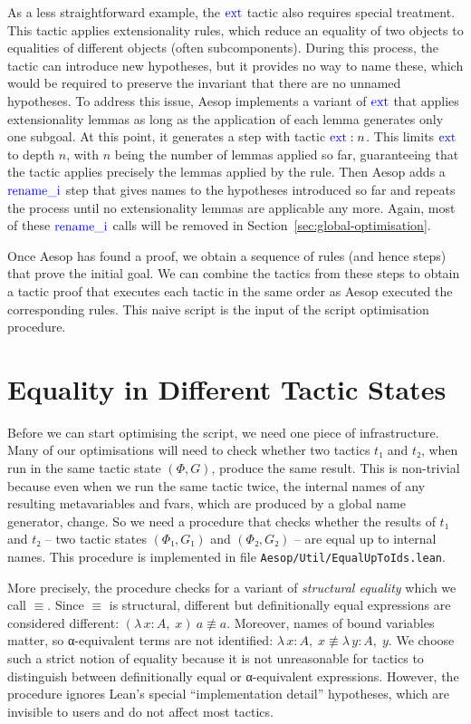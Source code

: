 \documentclass[sigplan,10pt,anonymous,review]{acmart}
\newcommand{\tac}[1]{\ensuremath{\mathrm{\mathcolor{blue}{#1}}}}
\newcommand{\Lam}[2]{λ\,#1,\; #2}
\begin{document}
As a less straightforward example, the \tac{ext} tactic also requires special treatment.
This tactic applies extensionality rules, which reduce an equality of two objects to equalities of different objects (often subcomponents).
During this process, the tactic can introduce new hypotheses, but it provides no way to name these, which would be required to preserve the invariant that there are no unnamed hypotheses.
To address this issue, Aesop implements a variant of \tac{ext} that applies extensionality lemmas as long as the application of each lemma generates only one subgoal.
At this point, it generates a step with tactic $\tac{ext} : n$.
This limits \tac{ext} to depth $n$, with $n$ being the number of lemmas applied so far, guaranteeing that the tactic applies precisely the lemmas applied by the rule.
Then Aesop adds a \tac{rename\_i} step that gives names to the hypotheses introduced so far and repeats the process until no extensionality lemmas are applicable any more.
Again, most of these \tac{rename\_i} calls will be removed in Section~\ref{sec:global-optimisation}.

\medskip

Once Aesop has found a proof, we obtain a sequence of rules (and hence steps) that prove the initial goal.
We can combine the tactics from these steps to obtain a tactic proof that executes each tactic in the same order as Aesop executed the corresponding rules.
This naive script is the input of the script optimisation procedure.

\section{Equality in Different Tactic States}%
\label{sec:equality}

Before we can start optimising the script, we need one piece of infrastructure.
Many of our optimisations will need to check whether two tactics $t₁$ and $t₂$, when run in the same tactic state $(Φ, G)$, produce the same result.
This is non-trivial because even when we run the same tactic twice, the internal names of any resulting metavariables and fvars, which are produced by a global name generator, change.
So we need a procedure that checks whether the results of $t₁$ and $t₂$ -- two tactic states $(Φ₁, G₁)$ and $(Φ₂, G₂)$ -- are equal up to internal names.
This procedure is implemented in file \texttt{Aesop/Util/EqualUpToIds.lean}.

More precisely, the procedure checks for a variant of \emph{structural equality} which we call $≡$.
Since $≡$ is structural, different but definitionally equal expressions are considered different: $(\Lam{x : A}{x})~a ≢ a$.
Moreover, names of bound variables matter, so α-equivalent terms are not identified: $\Lam{x : A}{x} ≢ \Lam{y : A}{y}$.
We choose such a strict notion of equality because it is not unreasonable for tactics to distinguish between definitionally equal or α-equivalent expressions.
However, the procedure ignores Lean's special \enquote{implementation detail} hypotheses, which are invisible to users and do not affect most tactics.
\end{document}
